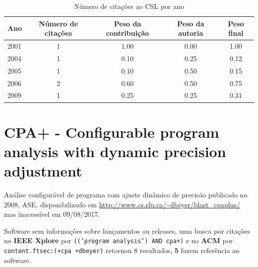 \begin{table}[h]
\caption{Número de citações ao CSL  por ano}
\centering
\begin{tabular}{| l | c | c | c | c |}
  \hline
  Ano & Número de citações & Peso da contribuição & Peso da autoria & Peso final \\
  \hline
  2001
    & 1
    & 1.00
    & 0.00
    & 1.00 \\
  2004
    & 1
    & 0.10
    & 0.25
    & 0.12 \\
  2005
    & 1
    & 0.10
    & 0.50
    & 0.15 \\
  2006
    & 2
    & 0.60
    & 0.50
    & 0.75 \\
  2009
    & 1
    & 0.25
    & 0.25
    & 0.31 \\
  \hline
\end{tabular}
\end{table}


\section{CPA+ - Configurable program analysis with dynamic precision adjustment}

Análise configurável de programa com ajuste dinâmico de precisão
publicado no 2008, ASE,
disponibilizado em \url{http://www.cs.sfu.ca/~dbeyer/blast_cpaplus/}
mas inacessível em 09/08/2017.

Software sem informações sobre lançamentos ou releases,
uma busca por citações no {\bf IEEE Xplore} por
\texttt{(('program analysis') AND cpa+)}
e no {\bf ACM} por
\texttt{content.ftsec:(+cpa +dbeyer)}
retornou
8 resultados,
{\bf 5} fazem referência ao software.

